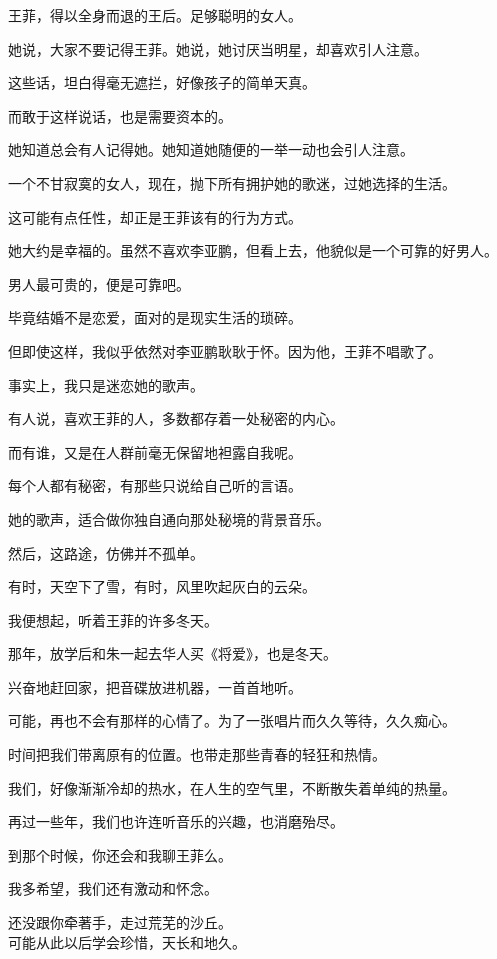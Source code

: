 \documentclass[12pt,a4paper]{article}
\begin{document}
		王菲，得以全身而退的王后。足够聪明的女人。\par
		她说，大家不要记得王菲。她说，她讨厌当明星，却喜欢引人注意。\par
		这些话，坦白得毫无遮拦，好像孩子的简单天真。\par
		而敢于这样说话，也是需要资本的。\par
		她知道总会有人记得她。她知道她随便的一举一动也会引人注意。\par
		一个不甘寂寞的女人，现在，抛下所有拥护她的歌迷，过她选择的生活。\par
		这可能有点任性，却正是王菲该有的行为方式。\par
		她大约是幸福的。虽然不喜欢李亚鹏，但看上去，他貌似是一个可靠的好男人。\par
		男人最可贵的，便是可靠吧。\par
		毕竟结婚不是恋爱，面对的是现实生活的琐碎。\par
		但即使这样，我似乎依然对李亚鹏耿耿于怀。因为他，王菲不唱歌了。

		事实上，我只是迷恋她的歌声。

		有人说，喜欢王菲的人，多数都存着一处秘密的内心。\par
		而有谁，又是在人群前毫无保留地袒露自我呢。\par
		每个人都有秘密，有那些只说给自己听的言语。\par
		她的歌声，适合做你独自通向那处秘境的背景音乐。\par
		然后，这路途，仿佛并不孤单。

		有时，天空下了雪，有时，风里吹起灰白的云朵。\par
		我便想起，听着王菲的许多冬天。\par
		那年，放学后和朱一起去华人买《将爱》，也是冬天。\par
		兴奋地赶回家，把音碟放进机器，一首首地听。\par
		可能，再也不会有那样的心情了。为了一张唱片而久久等待，久久痴心。\par
		时间把我们带离原有的位置。也带走那些青春的轻狂和热情。\par
		我们，好像渐渐冷却的热水，在人生的空气里，不断散失着单纯的热量。\par
		再过一些年，我们也许连听音乐的兴趣，也消磨殆尽。\par
		到那个时候，你还会和我聊王菲么。\par
		我多希望，我们还有激动和怀念。

		\longpoem{}{}{}
		还没跟你牵著手，走过荒芜的沙丘。\\
		可能从此以后学会珍惜，天长和地久。
		\endlongpoem
\end{document}

